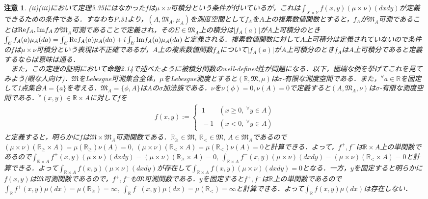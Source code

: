 \documentclass[a4paper,11pt]{jsarticle}
\newtheorem{attention}{注意}
\begin{document}
\begin{attention}
(ii)(iii)において定理3.35にはなかった$f$は$\mu\times\nu$可積分という条件が付いているが，これは$\int_{X\times Y}f(x,y)(\mu\times\nu)(dxdy)$が定義できるための条件である．すなわちP.31より，$(A,\mathfrak{M}_A,\mu_A)$を測度空間として$f_A$を$A$上の複素数値関数とすると，$f_A$が$\mathfrak{M}_A$可測であることは${\rm Re}f_A,{\rm Im}f_A$が$\mathfrak{M}_A$可測であることで定義され，その$E\in\mathfrak{M}_A$上の積分は$|f_A(a)|$が$A$上可積分のとき$\int_Ef_A(a)\mu_A(da)=\int_E{\rm Re}f_A(a)\mu_A(da)+i\int_E{\rm Im}f_A(a)\mu_A(da)$と定義される．複素数値関数に対して$A$上可積分は定義されていないので条件の$f$は$\mu\times\nu$可積分という表現は不正確であるが，$A$上の複素数値関数$f_A$について$|f_A(a)|$が$A$上可積分のとき$f_A$は$A$上可積分であると定義するならば意味は通る．\\
{\ }{\ }{\footnotesize また，この定理の証明において命題2.14で述べたように被積分関数のwell-defined性が問題になる．以下，極端な例を挙げてこれを見てみよう(暇な人向け)．$\mathfrak{M}$をLebesgue可測集合全体，$\mu$をLebesgue測度とすると$(\mathbb{R},\mathfrak{M},\mu)$は$\sigma$-有限な測度空間である．また，$^\forall a\in\mathbb{R}$を固定して1点集合$A=\{a\}$を考える．$\mathfrak{M}_A=\{\phi,A\}$は$A$の$\sigma$加法族である．$\nu$を$\nu(\phi)=0,\nu(A)=0$で定義すると$(A,\mathfrak{M}_A,\nu)$は$\sigma$-有限な測度空間である．$^\forall (x,y)\in\mathbb{R}\times A$に対して$f$を
\begin{eqnarray*}
f(x,y):=\begin{cases}
\displaystyle
{\ }1 & (x\geq 0,{\ } ^\forall y\in A) \\
{\ }-1 & (x<0,{\ } ^\forall y\in A)
\end{cases}
\end{eqnarray*}
と定義すると，明らかに$f$は$\mathfrak{M}\times\mathfrak{M}_A$可測関数である．$\mathbb{R}_\geq\in\mathfrak{M},{\ }\mathbb{R}_<\in\mathfrak{M},{\ }A\in\mathfrak{M}_A$であるので$(\mu\times\nu)(\mathbb{R}_\geq\times A)=\mu(\mathbb{R}_\geq)\nu(A)=0,{\ }(\mu\times\nu)(\mathbb{R}_<\times A)=\mu(\mathbb{R}_<)\nu(A)=0$と計算できる．よって，$f^+,f^-$は$\mathbb{R}\times A$上の単関数であるので$\int_{\mathbb{R}\times A}f^+(x,y)(\mu\times\nu)(dxdy)=(\mu\times\nu)(\mathbb{R}_\geq\times A)=0,{\ }\int_{\mathbb{R}\times A}f^-(x,y)(\mu\times\nu)(dxdy)=(\mu\times\nu)(\mathbb{R}_<\times A)=0$と計算できる．よって$\int_{\mathbb{R}\times A}f(x,y)(\mu\times\nu)(dxdy)$が存在して$\int_{\mathbb{R}\times A}f(x,y)(\mu\times\nu)(dxdy)=0$となる．一方，$y$を固定すると明らかに$f(x,y)$は$\mathfrak{M}$可測関数であるので，$f^+,f^-$も$\mathfrak{M}$可測関数である．$y$を固定すると$f^+,f^-$は$\mathbb{R}$上の単関数であるので$\int_\mathbb{R}f^+(x,y)\mu(dx)=\mu(\mathbb{R}_\geq)=\infty,{\ }\int_\mathbb{R}f^-(x,y)\mu(dx)=\mu(\mathbb{R}_<)=\infty$と計算できる．よって$\int_\mathbb{R}f(x,y)\mu(dx)$は存在しない．\\
}
\end{attention}
\end{document}

